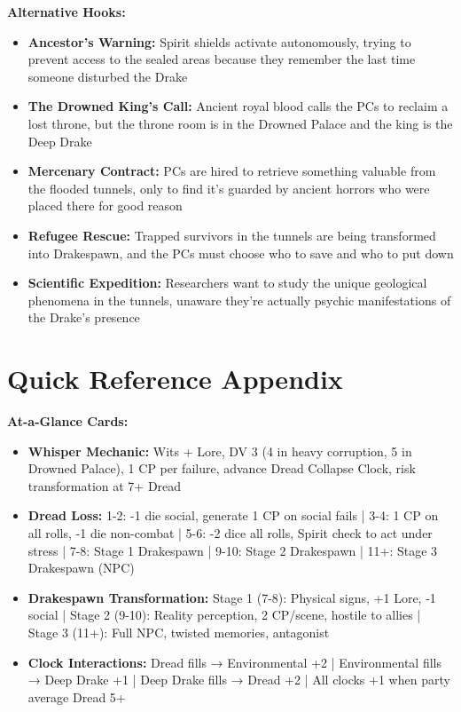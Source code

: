 \documentclass[11pt]{article}
\begin{document}
\textbf{Alternative Hooks:}
\begin{itemize}
\item \textbf{Ancestor's Warning:} Spirit shields activate autonomously, trying to prevent access to the sealed areas because they remember the last time someone disturbed the Drake
\item \textbf{The Drowned King's Call:} Ancient royal blood calls the PCs to reclaim a lost throne, but the throne room is in the Drowned Palace and the king is the Deep Drake
\item \textbf{Mercenary Contract:} PCs are hired to retrieve something valuable from the flooded tunnels, only to find it's guarded by ancient horrors who were placed there for good reason
\item \textbf{Refugee Rescue:} Trapped survivors in the tunnels are being transformed into Drakespawn, and the PCs must choose who to save and who to put down
\item \textbf{Scientific Expedition:} Researchers want to study the unique geological phenomena in the tunnels, unaware they're actually psychic manifestations of the Drake's presence
\end{itemize}

\section{Quick Reference Appendix}

\textbf{At-a-Glance Cards:}
\begin{itemize}
\item \textbf{Whisper Mechanic:} Wits + Lore, DV 3 (4 in heavy corruption, 5 in Drowned Palace), 1 CP per failure, advance Dread Collapse Clock, risk transformation at 7+ Dread
\item \textbf{Dread Loss:} 1-2: -1 die social, generate 1 CP on social fails | 3-4: 1 CP on all rolls, -1 die non-combat | 5-6: -2 dice all rolls, Spirit check to act under stress | 7-8: Stage 1 Drakespawn | 9-10: Stage 2 Drakespawn | 11+: Stage 3 Drakespawn (NPC)
\item \textbf{Drakespawn Transformation:} Stage 1 (7-8): Physical signs, +1 Lore, -1 social | Stage 2 (9-10): Reality perception, 2 CP/scene, hostile to allies | Stage 3 (11+): Full NPC, twisted memories, antagonist
\item \textbf{Clock Interactions:} Dread fills → Environmental +2 | Environmental fills → Deep Drake +1 | Deep Drake fills → Dread +2 | All clocks +1 when party average Dread 5+
\end{itemize}
\end{document}
